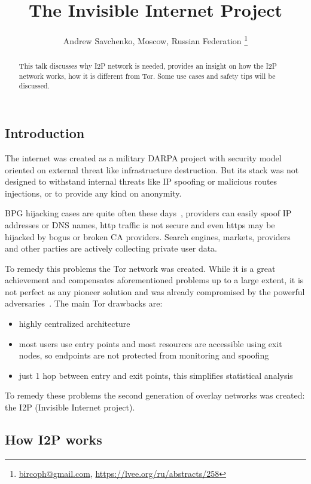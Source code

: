 \documentclass[10pt, a5paper]{article}
\begin{document}
\title{The Invisible Internet Project}
\author{Andrew Savchenko, Moscow, Russian Federation \footnote{\url{bircoph@gmail.com}, \url {https://lvee.org/ru/abstracts/258}}}
\maketitle
\begin{abstract}
This talk discusses why I2P network is needed, provides an insight on how the I2P network works, how it is different from Tor. Some use cases and safety tips will be discussed.
\end{abstract}
\subsection*{Introduction}

The internet was created as a military DARPA project with security model oriented on external threat like infrastructure destruction. But its stack was not designed to withstand internal threats like IP spoofing or malicious routes injections, or to provide any kind on anonymity.

BPG hijacking cases are quite often these days~\cite{Savchenko-1}, providers can easily spoof IP addresses or DNS names, http traffic is not secure and even https may be hijacked by bogus or broken CA providers. Search engines, markets, providers and other parties are actively collecting private user data.

To remedy this problems the Tor network was created. While it is a great achievement and compensates aforementioned problems up to a large extent, it is not perfect as any pioneer solution and was already compromised by the powerful adversaries~\cite{Savchenko-2}. The main Tor drawbacks are:

\begin{itemize}
  \item highly centralized architecture
  \item most users use entry points and most resources are accessible using exit nodes, so endpoints are not protected from monitoring and spoofing
  \item just 1 hop between entry and exit points, this simplifies statistical analysis
\end{itemize}

To remedy these problems the second generation of overlay networks was created: the I2P (Invisible Internet project).

\subsection*{How I2P works}
\end{document}

